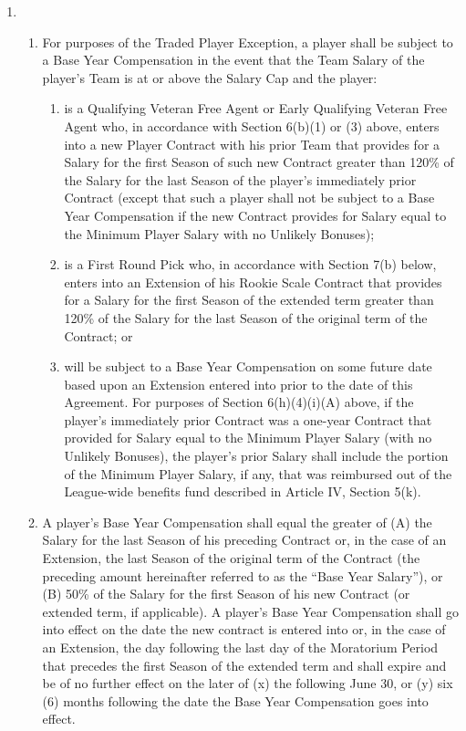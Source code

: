 \documentclass[
]{book}
\providecommand{\tightlist}{%
  \setlength{\itemsep}{0pt}\setlength{\parskip}{0pt}}
\begin{document}
\begin{enumerate}
\begin{enumerate}
  \item
    \begin{enumerate}
    \def\labelenumiii{(\roman{enumiii})}
    \tightlist
    \item
      For purposes of the Traded Player Exception, a player shall be subject to a Base Year Compensation in the event that the Team Salary of the player's Team is at or above the Salary Cap and the player:

      \begin{enumerate}
      \def\labelenumiv{(\Alph{enumiv})}
      \tightlist
      \item
        is a Qualifying Veteran Free Agent or Early Qualifying Veteran Free Agent who, in accordance with Section 6(b)(1) or (3) above, enters into a new Player Contract with his prior Team that provides for a Salary for the first Season of such new Contract greater than 120\% of the Salary for the last Season of the player's immediately prior Contract (except that such a player shall not be subject to a Base Year Compensation if the new Contract provides for Salary equal to the Minimum Player Salary with no Unlikely Bonuses);
      \item
        is a First Round Pick who, in accordance with Section 7(b) below, enters into an Extension of his Rookie Scale Contract that provides for a Salary for the first Season of the extended term greater than 120\% of the Salary for the last Season of the original term of the Contract; or
      \item
        will be subject to a Base Year Compensation on some future date based upon an Extension entered into prior to the date of this Agreement. For purposes of Section 6(h)(4)(i)(A) above, if the player's immediately prior Contract was a one-year Contract that provided for Salary equal to the Minimum Player Salary (with no Unlikely Bonuses), the player's prior Salary shall include the portion of the Minimum Player Salary, if any, that was reimbursed out of the League-wide benefits fund described in Article IV, Section 5(k).
      \end{enumerate}
    \item
      A player's Base Year Compensation shall equal the greater of (A) the Salary for the last Season of his preceding Contract or, in the case of an Extension, the last Season of the original term of the Contract (the preceding amount hereinafter referred to as the ``Base Year Salary''), or (B) 50\% of the Salary for the first Season of his new Contract (or extended term, if applicable). A player's Base Year Compensation shall go into effect on the date the new contract is entered into or, in the case of an Extension, the day following the last day of the Moratorium Period that precedes the first Season of the extended term and shall expire and be of no further effect on the later of (x) the following June 30, or (y) six (6) months following the date the Base Year Compensation goes into effect.

\end{enumerate}
\end{enumerate}
\end{enumerate}
\end{document}
